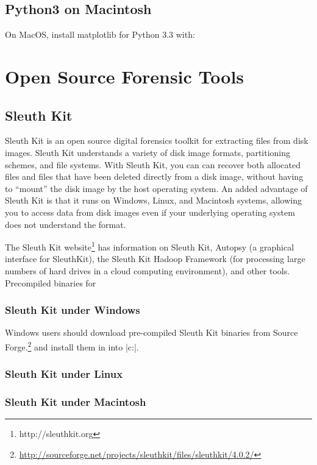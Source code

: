\subsection{Python3 on Macintosh}
On MacOS, install matplotlib for Python 3.3 with:

\section{Open Source Forensic Tools}

\subsection{Sleuth Kit}

Sleuth Kit is an open source digital forensics toolkit for extracting
files from disk images. Sleuth Kit understands a variety of disk image
formats, partitioning schemes, and file systems. With Sleuth Kit, you can can recover
both allocated files and files that have been deleted directly from a
disk image, without having to ``mount'' the disk image by the host
operating system. An added advantage of Sleuth Kit is that it runs on
Windows, Linux, and Macintosh systems, allowing you to access data
from disk images even if your underlying operating system does not
understand the format.

The Sleuth Kit website\footnote{http://sleuthkit.org} has information
on Sleuth Kit, Autopsy (a graphical interface for SleuthKit), the
Sleuth Kit Hadoop Framework (for processing large numbers of hard
drives in a cloud computing environment), and other tools. 
Precompiled binaries for

\subsubsection{Sleuth Kit under Windows}
Windows users should download pre-compiled Sleuth Kit binaries from Source
Forge.\footnote{\url{http://sourceforge.net/projects/sleuthkit/files/sleuthkit/4.0.2/}}
and install them in into |c:\sleuthkit|.

\subsubsection{Sleuth Kit under Linux}

\subsubsection{Sleuth Kit under Macintosh}

